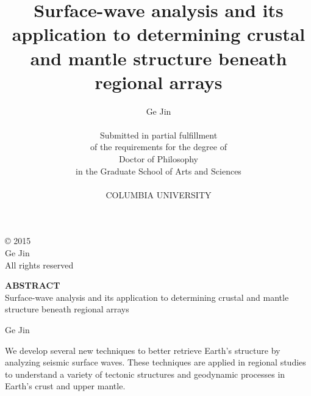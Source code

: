 \begin{titlepage}
\singlespacing
\title{Surface-wave analysis and its application to determining crustal and mantle structure beneath regional arrays}
\author{Ge Jin\\
\vspace{272pt}\\
Submitted in partial fulfillment \\
of the requirements
for the degree of \\
Doctor of Philosophy \\
in the Graduate School of Arts and Sciences \\
\vspace{24pt}\\
COLUMBIA UNIVERSITY \\}
\maketitle
\end{titlepage}

\vspace{10cm}
\singlespacing
\null
\begin{center}
\begin{bottompar}
{\large \copyright  \hspace{1mm} 2015 \\
Ge Jin\\
All rights reserved}
\end{bottompar}

\doublespacing
\large
{\bf ABSTRACT}\\
Surface-wave analysis and its application to determining crustal and mantle structure beneath regional arrays

Ge Jin
\end{center}
\doublespacing

We develop several new techniques to better retrieve Earth's structure by analyzing seismic surface waves. These techniques are applied in regional studies to understand a variety of tectonic structures and geodynamic processes in Earth's crust and upper mantle.


